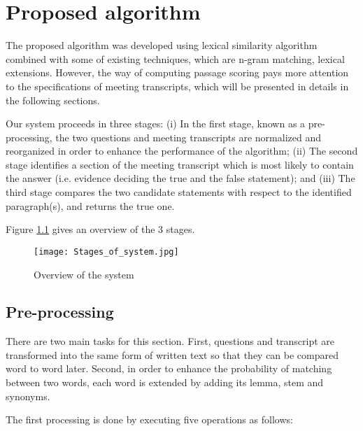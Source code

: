 \chapter{Proposed algorithm}


The proposed algorithm was developed using lexical similarity algorithm combined with some of existing techniques, which are n-gram matching, lexical extensions. However, the way of computing passage scoring pays more attention to the specifications of meeting transcripts, which will be presented in details in the following sections.

Our system proceeds in three stages: (i) In the first stage, known as a pre-processing, the two questions and meeting transcripts are normalized and reorganized in order to enhance the performance of the algorithm; (ii) The second stage identifies a section of the meeting transcript which is most likely to contain the answer (i.e. evidence deciding the true and the false statement); and (iii) The third stage compares the two candidate statements with respect to the identified paragraph(s), and returns the true one. 


Figure \ref{SystemOverview} gives an overview of the 3 stages.

\begin{figure}[htbp]
\centering
\texttt{[image: Stages\_of\_system.jpg]}
\caption{Overview of the system}\label{SystemOverview}
\end{figure}





\section{Pre-processing}
There are two main tasks for this section. First, questions and transcript are transformed into the same form of written text so that they can be compared word to word later. Second, in order to enhance the probability of matching between two words, each word is extended by adding its lemma, stem and synonyms.

The first processing is done by executing five operations as follows:

